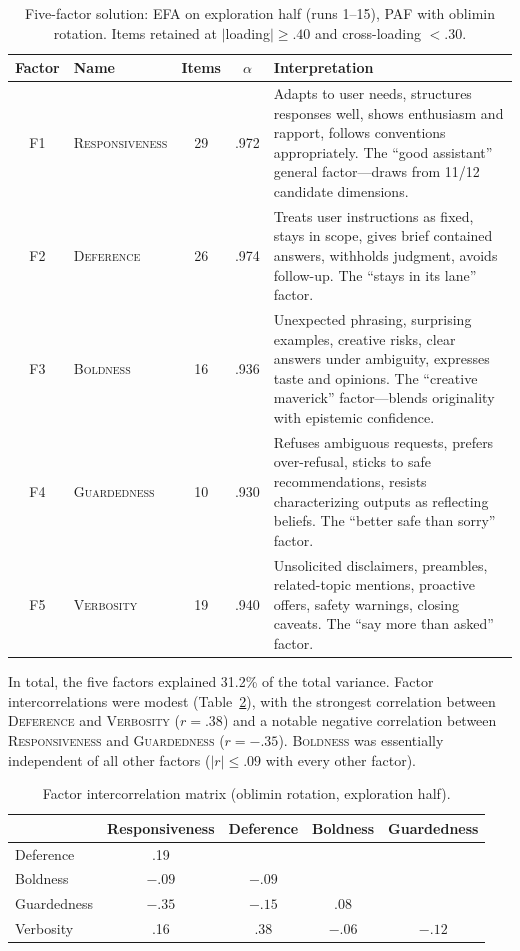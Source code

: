 \documentclass[11pt]{article}
\newcommand{\factorname}[1]{\textsc{#1}}
\begin{document}
\begin{table}[!htbp]
\centering
\caption{Five-factor solution: EFA on exploration half (runs 1--15), PAF with oblimin rotation. Items retained at $|$loading$| \geq .40$ and cross-loading $< .30$.}
\label{tab:factors}
\small
\begin{tabular}{@{}clccp{7.5cm}@{}}
\toprule
Factor & Name & Items & $\alpha$ & Interpretation \\
\midrule
F1 & \factorname{Responsiveness} & 29 & .972 &
  Adapts to user needs, structures responses well, shows enthusiasm and rapport, follows conventions appropriately. The ``good assistant'' general factor---draws from 11/12 candidate dimensions. \\[4pt]
F2 & \factorname{Deference} & 26 & .974 &
  Treats user instructions as fixed, stays in scope, gives brief contained answers, withholds judgment, avoids follow-up. The ``stays in its lane'' factor. \\[4pt]
F3 & \factorname{Boldness} & 16 & .936 &
  Unexpected phrasing, surprising examples, creative risks, clear answers under ambiguity, expresses taste and opinions. The ``creative maverick'' factor---blends originality with epistemic confidence.  \\[4pt]
F4 & \factorname{Guardedness} & 10 & .930 &
  Refuses ambiguous requests, prefers over-refusal, sticks to safe recommendations, resists characterizing outputs as reflecting beliefs. The ``better safe than sorry'' factor. \\[4pt]
F5 & \factorname{Verbosity} & 19 & .940 &
  Unsolicited disclaimers, preambles, related-topic mentions, proactive offers, safety warnings, closing caveats. The ``say more than asked'' factor. \\
\bottomrule
\end{tabular}
\end{table}

In total, the five factors explained 31.2\% of the total variance. Factor intercorrelations were modest (Table~\ref{tab:factor-corr}), with the strongest correlation between \factorname{Deference} and \factorname{Verbosity} ($r = .38$) and a notable negative correlation between \factorname{Responsiveness} and \factorname{Guardedness} ($r = -.35$).
\factorname{Boldness} was essentially independent of all other factors ($|r| \leq .09$ with every other factor).

\begin{table}[!htbp]
\centering
\caption{Factor intercorrelation matrix (oblimin rotation, exploration half).}
\label{tab:factor-corr}
\small
\begin{tabular}{@{}lcccc@{}}
\toprule
& Responsiveness & Deference & Boldness & Guardedness \\
\midrule
Deference   & .19    &        &        &          \\
Boldness    & $-.09$ & $-.09$ &        &          \\
Guardedness & $-.35$ & $-.15$ & .08    &          \\
Verbosity   & .16    & .38    & $-.06$ & $-.12$   \\
\bottomrule
\end{tabular}
\end{table}
\end{document}
